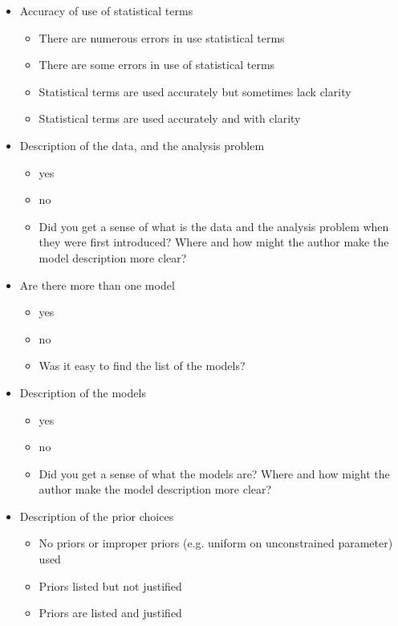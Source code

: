 \documentclass[a4paper,11pt]{article}
\begin{document}
\begin{itemize}
\item Accuracy of use of statistical terms
  \begin{itemize}
  \item There are numerous errors in use statistical terms
  \item There are some errors in use of statistical terms
  \item Statistical terms are used accurately but sometimes lack clarity
  \item Statistical terms are used accurately and with clarity
  \end{itemize}
  
\item  Description of the data, and the analysis problem
  \begin{itemize}
  \item yes
  \item no
  \item Did you get a sense of what is the data and the analysis problem when they were first introduced? Where and how might the author make the model description more clear?
\end{itemize}

\item Are there more than one model
  \begin{itemize}
  \item yes
  \item no
  \item Was it easy to find the list of the models?
\end{itemize}

\item Description of the models
  \begin{itemize}
  \item yes
  \item no
  \item Did you get a sense of what the models are? Where and 
  how might the author make the model description more clear?
\end{itemize}

\item Description of the prior choices
  \begin{itemize}
  \item No priors or improper priors (e.g. uniform on unconstrained parameter) used 
  \item Priors listed but not justified
  \item Priors are listed and justified
  \end{itemize}
  

\end{itemize}
\end{document}
